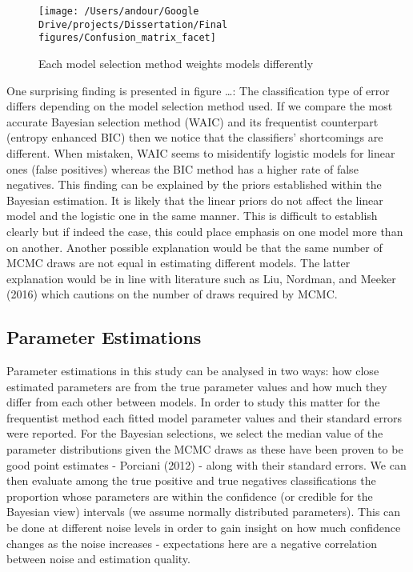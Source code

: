 \documentclass[]{article}
\begin{document}
\begin{figure}

{\centering \texttt{[image: /Users/andour/Google Drive/projects/Dissertation/Final figures/Confusion\_matrix\_facet]} 

}

\caption{Each model selection method weights models differently}\label{fig:unnamed-chunk-5}
\end{figure}

One surprising finding is presented in figure \ldots{}: The
classification type of error differs depending on the model selection
method used. If we compare the most accurate Bayesian selection method
(WAIC) and its frequentist counterpart (entropy enhanced BIC) then we
notice that the classifiers' shortcomings are different. When mistaken,
WAIC seems to misidentify logistic models for linear ones (false
positives) whereas the BIC method has a higher rate of false negatives.
This finding can be explained by the priors established within the
Bayesian estimation. It is likely that the linear priors do not affect
the linear model and the logistic one in the same manner. This is
difficult to establish clearly but if indeed the case, this could place
emphasis on one model more than on another. Another possible explanation
would be that the same number of MCMC draws are not equal in estimating
different models. The latter explanation would be in line with
literature such as Liu, Nordman, and Meeker (2016) which cautions on the
number of draws required by MCMC.

\hypertarget{parameter-estimations}{%
\subsection{Parameter Estimations}\label{parameter-estimations}}

Parameter estimations in this study can be analysed in two ways: how
close estimated parameters are from the true parameter values and how
much they differ from each other between models. In order to study this
matter for the frequentist method each fitted model parameter values and
their standard errors were reported. For the Bayesian selections, we
select the median value of the parameter distributions given the MCMC
draws as these have been proven to be good point estimates - Porciani
(2012) - along with their standard errors. We can then evaluate among
the true positive and true negatives classifications the proportion
whose parameters are within the confidence (or credible for the Bayesian
view) intervals (we assume normally distributed parameters). This can be
done at different noise levels in order to gain insight on how much
confidence changes as the noise increases - expectations here are a
negative correlation between noise and estimation quality.
\end{document}
